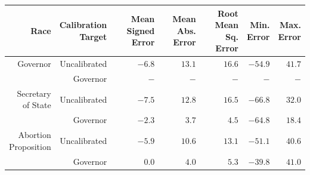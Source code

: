 
\begin{tabular}{rrrrrrr}
\toprule
Race & \makecell[r]{Calibration\\Target} & \makecell[r]{Mean\\Signed Error} & \makecell[r]{Mean\\Abs. Error} & \makecell[r]{Root Mean\\Sq. Error} & \makecell[r]{Min.\\Error} & \makecell[r]{Max.\\Error}\\
\midrule
Governor & Uncalibrated & $-6.8$ & $13.1$ & $16.6$ & $-54.9$ & $41.7$\\
 & Governor & $-$ & $-$ & $-$ & $-$ & $-$\\
\midrule
\makecell[r]{Secretary\\of State} & Uncalibrated & $-7.5$ & $12.8$ & $16.5$ & $-66.8$ & $32.0$\\
\addlinespace
 & Governor & $-2.3$ & $ 3.7$ & $ 4.5$ & $-64.8$ & $18.4$\\
\midrule
\makecell[r]{Abortion\\Proposition} & Uncalibrated & $-5.9$ & $10.6$ & $13.1$ & $-51.1$ & $40.6$\\
 & Governor & $ 0.0$ & $ 4.0$ & $ 5.3$ & $-39.8$ & $41.0$\\
\bottomrule
\end{tabular}